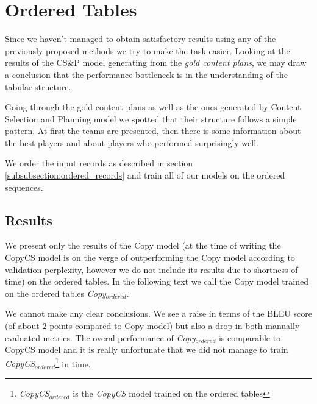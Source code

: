 \section{Ordered Tables}

Since we haven't managed to obtain satisfactory results using any of the previously proposed methods we try to make the task easier. Looking at the results of the CS\&P model generating from the \emph{gold content plans}, we may draw a conclusion that the performance bottleneck is in the understanding of the tabular structure.

Going through the gold content plans as well as the ones generated by Content Selection and Planning model we spotted that their structure follows a simple pattern. At first the teams are presented, then there is some information about the best players and about players who performed surprisingly well.

We order the input records as described in section \ref{subsubsection:ordered_records} and train all of our models on the ordered sequences.

\subsection{Results}

We present only the results of the Copy model (at the time of writing the CopyCS model is on the verge of outperforming the Copy model according to validation perplexity, however we do not include its results due to shortness of time) on the ordered tables. In the following text we call the Copy model trained on the ordered tables \emph{Copy$_{ordered}$}.

We cannot make any clear conclusions. We see a raise in terms of the BLEU score (of about $2$ points compared to Copy model) but also a drop in both manually evaluated metrics. The overal performance of \emph{Copy$_{ordered}$} is comparable to CopyCS model and it is really unfortunate that we did not manage to train \emph{CopyCS$_{ordered}$}\footnote{\emph{CopyCS$_{ordered}$} is the \emph{CopyCS} model trained on the ordered tables} in time.

